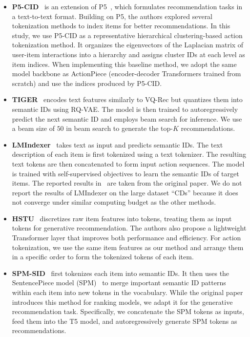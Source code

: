 \begin{itemize}
    \item \textbf{P5-CID}~\cite{hua2023p5cid} is an extension of P5~\cite{geng2022p5}, which formulates recommendation tasks in a text-to-text format. Building on P5, the authors explored several tokenization methods to index items for better recommendations. In this study, we use P5-CID as a representative hierarchical clustering-based action tokenization method. It organizes the eigenvectors of the Laplacian matrix of user-item interactions into a hierarchy and assigns cluster IDs at each level as item indices. When implementing this baseline method, we adopt the same model backbone as ActionPiece (encoder-decoder Transformers trained from scratch) and use the indices  produced by P5-CID.
    \item \textbf{TIGER}~\cite{rajput2023tiger} encodes text features similarly to VQ-Rec but quantizes them into semantic IDs using RQ-VAE. The model is then trained to autoregressively predict the next semantic ID and employs beam search for inference. We use a beam size of $50$ in beam search to generate the top-$K$ recommendations.
    \item \textbf{LMIndexer}~\cite{jin2024lmindexer} takes text as input and predicts semantic IDs. The text description of each item is first tokenized using a text tokenizer. The resulting text tokens are then concatenated to form input action sequences. The model is trained with self-supervised objectives to learn the semantic IDs of target items. The reported results in~ are taken from the original paper. We do not report the results of LMIndexer on the large dataset ``CDs'' because it does not converge under similar computing budget as the other methods.
    \item \textbf{HSTU}~\cite{zhai2024hstu} discretizes raw item features into tokens, treating them as input tokens for generative recommendation. The authors also propose a lightweight Transformer layer that improves both performance and efficiency. For action tokenization, we use the same item features as our method and arrange them in a specific order to form the tokenized tokens of each item.
    \item \textbf{SPM-SID}~\cite{singh2024spmsid} first tokenizes each item into semantic IDs. It then uses the SentencePiece model (SPM)~\cite{kudo2018sentencepiece} to merge important semantic ID patterns within each item into new tokens in the vocabulary. While the original paper introduces this method for ranking models, we adapt it for the generative recommendation task. Specifically, we concatenate the SPM tokens as inputs, feed them into the T5 model, and autoregressively generate SPM tokens as recommendations.
\end{itemize}

